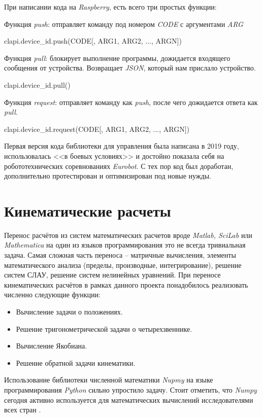 При написании кода на \textit{Raspberry}, есть всего три простых функции:

\noindent Функция \textit{push}: отправляет команду под номером \textit{CODE} с аргументами \textit{ARG}
\begin{code}
clapi.device_id.push(CODE[, ARG1, ARG2, ..., ARGN])
\end{code}

\noindent Функция \textit{pull}: блокирует выполнение программы, дожидается входящего сообщения от устройства. Возвращает \textit{JSON}, который нам прислало устройство.
\begin{code}
clapi.device_id.pull()
\end{code}

\noindent Функция \textit{request}: отправляет команду как \textit{push}, после чего дожидается ответа как \textit{pull}.
\begin{code}
clapi.device_id.request(CODE[, ARG1, ARG2, ..., ARGN])
\end{code}

Первая версия кода библиотеки для управления была написана в 2019 году, использовалась <<в боевых условиях>> и достойно показала себя на робототехнических соревнованиях \textit{Eurobot}. С тех пор код был доработан, дополнительно протестирован и оптимизирован под новые нужды.

\section{Кинематические расчеты}

Перенос расчётов из систем математических расчетов вроде \textit{Matlab, SciLab} или \textit{Mathematica} на один из языков программирования это не всегда тривиальная задача. Самая сложная часть переноса -- матричные вычисления, элементы математического анализа (пределы, производные, интегрирование), решение систем СЛАУ, решение систем нелинейных уравнений. При переносе кинематических расчётов в рамках данного проекта понадобилось реализовать численно следующие функции:
\begin{itemize}
    \item Вычисление задачи о положениях.
    \item Решение тригонометрической задачи о четырехзвеннике.
    \item Вычисление Якобиана.
    \item Решение обратной задачи кинематики.
\end{itemize}

Использование библиотеки численной математики \textit{Nupmy} на языке программирования \textit{Python} сильно упростило задачу. Стоит отметить, что \textit{Numpy} сегодня активно используется для математических вычислений исследователями всех стран \cite{Numpy2020}.

